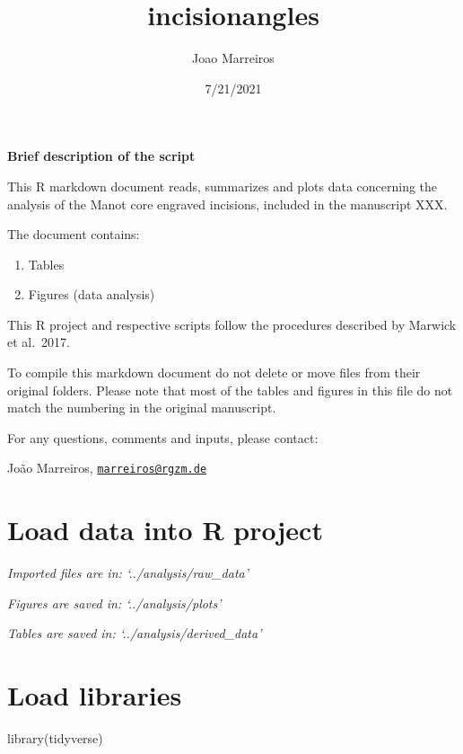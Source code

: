 \documentclass[
]{article}
\title{incisionangles}
\author{Joao Marreiros}
\date{7/21/2021}
\newenvironment{Shaded}{\begin{snugshade}}{\end{snugshade}}
\newcommand{\FunctionTok}[1]{\textcolor[rgb]{0.00,0.00,0.00}{#1}}
\newcommand{\NormalTok}[1]{#1}
\providecommand{\tightlist}{%
  \setlength{\itemsep}{0pt}\setlength{\parskip}{0pt}}
\begin{document}
\maketitle

\textbf{Brief description of the script}

This R markdown document reads, summarizes and plots data concerning the
analysis of the Manot core engraved incisions, included in the
manuscript XXX.

The document contains:

\begin{enumerate}
\def\labelenumi{\arabic{enumi}.}
\tightlist
\item
  Tables
\item
  Figures (data analysis)
\end{enumerate}

This R project and respective scripts follow the procedures described by
Marwick et al.~2017.

To compile this markdown document do not delete or move files from their
original folders. Please note that most of the tables and figures in
this file do not match the numbering in the original manuscript.

For any questions, comments and inputs, please contact:

João Marreiros,
\href{mailto:marreiros@rgzm.de}{\nolinkurl{marreiros@rgzm.de}}

\hypertarget{load-data-into-r-project}{%
\section{Load data into R project}\label{load-data-into-r-project}}

\emph{Imported files are in: `../analysis/raw\_data'}

\emph{Figures are saved in: `../analysis/plots'}

\emph{Tables are saved in: `../analysis/derived\_data'}

\hypertarget{load-libraries}{%
\section{Load libraries}\label{load-libraries}}

\begin{Shaded}
\begin{Highlighting}[]
\FunctionTok{library}\NormalTok{(tidyverse)}
\end{Highlighting}
\end{Shaded}
\end{document}
